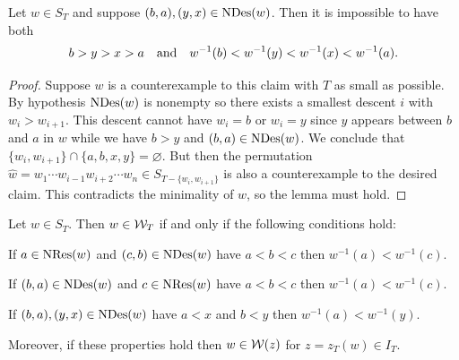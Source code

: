 \documentclass[10pt]{article}
\begin{document}
\begin{lemma}
\label{cW-pre-lem}
Let $w \in S_T$ and suppose $(b,a),(y,x) \in \mathrm{NDes}(w)$.
Then it is impossible to have both
\[ b>y>x>a \quad\text{and}\quad w^{-1}(b) < w^{-1}(y) < w^{-1}(x) < w^{-1}(a).\]
\end{lemma}

\begin{proof}
Suppose $w$ is a counterexample to this claim with $T$ as small as possible. 
By hypothesis $\mathrm{NDes}(w)$ is nonempty so there exists a smallest descent $i$
with $w_i>w_{i+1}$. This descent cannot have $w_i=b$ or $w_i = y$
since  $y$ appears between
$b$ and $a$ in $w$ while we have $b>y$ and  $(b,a) \in \mathrm{NDes}(w)$.
We conclude that 
 $\{w_i,w_{i+1}\} \cap\{ a,b,x,y\} =\varnothing$.
 But then the permutation
 $\hat w = w_1\cdots w_{i-1} w_{i+2}\cdots w_n \in S_{T - \{w_i,w_{i+1}\}}$
 is also a counterexample to the desired claim.
 This contradicts the minimality of $w$, so the lemma must hold.
\end{proof}

\begin{theorem}
\label{cW-lem}
Let $w \in S_T$. Then $w \in \mathcal{W}_T$ if and only if the following conditions hold:
\ben
\item[(a)] If $a \in \mathrm{NRes}(w)$ and $(c,b) \in\mathrm{NDes}(w)$ have $a<b<c$ then $w^{-1}(a) < w^{-1}(c) $.

\item[(b)] If $(b,a) \in\mathrm{NDes}(w)$ and $c \in \mathrm{NRes}(w)$ have $a<b<c$ then $ w^{-1}(a) < w^{-1}(c)$.

\item[(c)] If $(b,a),(y,x) \in\mathrm{NDes}(w)$ have $a<x$ and $b<y$ 
then $ w^{-1}(a) < w^{-1}(y) $.

\een
Moreover, if these properties hold then $w \in \mathcal{W}(z)$ for $z =z_T(w) \in I_T$.
\end{theorem}
\end{document}
